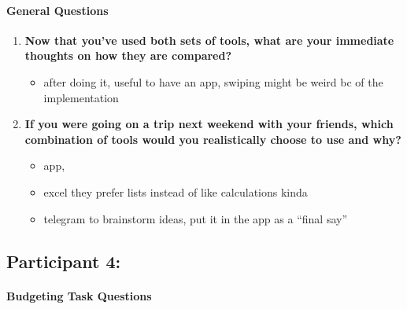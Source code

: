 \documentclass[12pt,a4paper]{article}
\begin{document}
\paragraph{General Questions}

\begin{enumerate}
    \item \textbf{Now that you've used both sets of tools, what are your immediate thoughts on how they are compared?}
    
    \begin{itemize}
        \item after doing it, useful to have an app, swiping might be weird bc of the implementation
    \end{itemize}
    
    \item \textbf{If you were going on a trip next weekend with your friends, which combination of tools would you realistically choose to use and why?}
    
    \begin{itemize}
        \item app,
        \item excel they prefer lists instead of like calculations kinda
        \item telegram to brainstorm ideas, put it in the app as a ``final say''
    \end{itemize}
\end{enumerate}

\subsection{Participant 4:}
\paragraph{Budgeting Task Questions}
\end{document}
